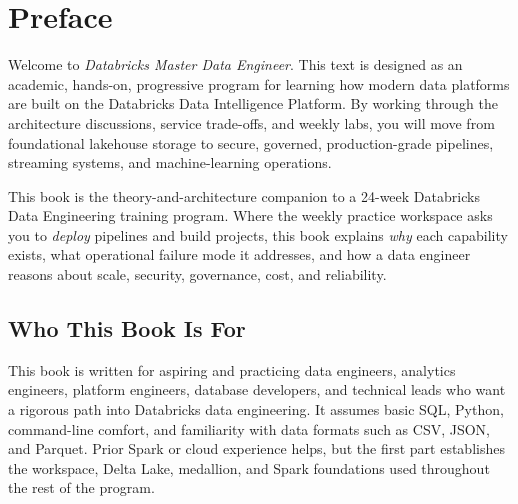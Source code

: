 \chapter*{Preface}
Welcome to \textit{Databricks Master Data Engineer}. This text is designed as an academic, hands-on, progressive program for learning how modern data platforms are built on the Databricks Data Intelligence Platform. By working through the architecture discussions, service trade-offs, and weekly labs, you will move from foundational lakehouse storage to secure, governed, production-grade pipelines, streaming systems, and machine-learning operations.

This book is the theory-and-architecture companion to a 24-week Databricks Data Engineering training program. Where the weekly practice workspace asks you to \emph{deploy} pipelines and build projects, this book explains \emph{why} each capability exists, what operational failure mode it addresses, and how a data engineer reasons about scale, security, governance, cost, and reliability.

\section*{Who This Book Is For}
This book is written for aspiring and practicing data engineers, analytics engineers, platform engineers, database developers, and technical leads who want a rigorous path into Databricks data engineering. It assumes basic SQL, Python, command-line comfort, and familiarity with data formats such as CSV, JSON, and Parquet. Prior Spark or cloud experience helps, but the first part establishes the workspace, Delta Lake, medallion, and Spark foundations used throughout the rest of the program.


